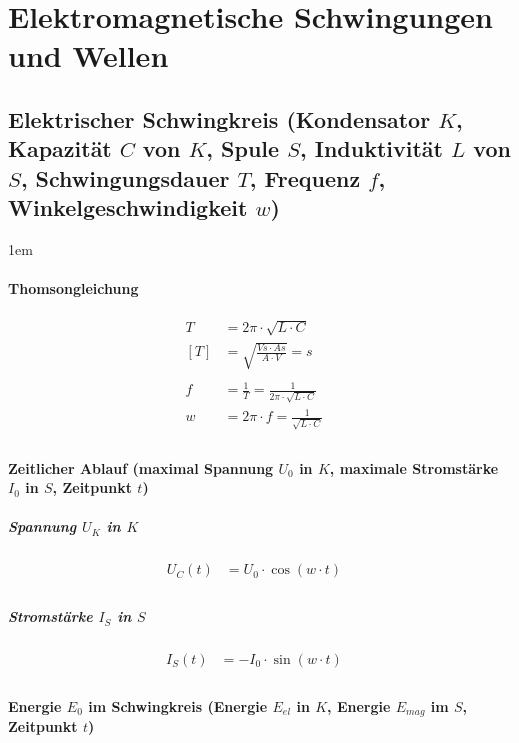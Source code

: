 \section{Elektromagnetische Schwingungen und Wellen}

\subsection{Elektrischer Schwingkreis (Kondensator $K$, Kapazität $C$ von $K$, Spule $S$,
Induktivität $L$ von $S$, Schwingungsdauer $T$, Frequenz $f$, Winkelgeschwindigkeit $w$)}

\leftskip1em
\paragraph{Thomsongleichung}

\begin{align*}
  T &= 2 \pi \cdot \sqrt{L \cdot C} &\\
  [T] &= \sqrt{\frac{Vs \cdot As}{A \cdot V}} = s &\\
  &\\
  f &= \frac{1}{T} = \frac{1}{2 \pi \cdot \sqrt{L \cdot C}} &\\
  w &= 2 \pi \cdot f = \frac{1}{\sqrt{L \cdot C}} &\\
\end{align*}

\paragraph{Zeitlicher Ablauf (maximal Spannung $U_0$ in $K$, maximale Stromstärke $I_0$ in $S$,
Zeitpunkt $t$)}

\subparagraph{Spannung $U_K$ in $K$}

\begin{align*}
  U_C \left(t\right) &= U_0 \cdot \cos \left(w \cdot t\right) &\\
\end{align*}

\subparagraph{Stromstärke $I_S$ in $S$}

\begin{align*}
  I_S \left(t\right) &= - I_0 \cdot \sin \left(w \cdot t\right) &\\
\end{align*}

\paragraph{Energie $E_0$ im Schwingkreis (Energie $E_{el}$ in $K$, Energie $E_{mag}$
im $S$, Zeitpunkt $t$)}

